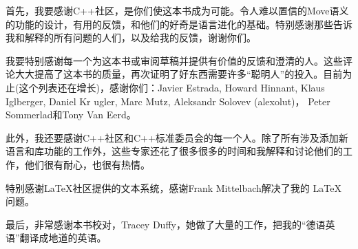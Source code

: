 首先，我要感谢C++社区，是你们使这本书成为可能。令人难以置信的Move语义的功能的设计，有用的反馈，和他们的好奇是语言进化的基础。特别感谢那些告诉我和解释的所有问题的人们，以及给我的反馈，谢谢你们。\par

我要特别感谢每一个为这本书或审阅草稿并提供有价值的反馈和澄清的人。这些评论大大提高了这本书的质量，再次证明了好东西需要许多“聪明人”的投入。目前为止(这个列表还在增长)，感谢你们：Javier Estrada, Howard Hinnant, Klaus Iglberger, Daniel Kr ugler, Marc Mutz, Aleksandr Solovev (alexolut)， Peter Sommerlad和Tony Van Eerd。\par

此外，我还要感谢C++社区和C++标准委员会的每一个人。除了所有涉及添加新语言和库功能的工作外，这些专家还花了很多很多的时间和我解释和讨论他们的工作，他们很有耐心，也很有热情。\par

特别感谢LaTeX社区提供的文本系统，感谢Frank Mittelbach解决了我的 \LaTeX\xspace 问题。\par

最后，非常感谢本书校对，Tracey Duffy，她做了大量的工作，把我的“德语英语”翻译成地道的英语。\par

\newpage
















